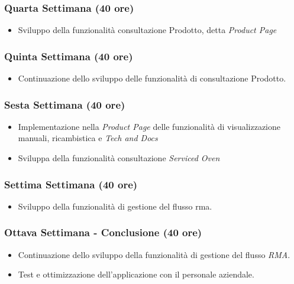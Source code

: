 \subsubsection*{Quarta Settimana (40 ore)}
\begin{itemize}
    \item Sviluppo della funzionalità consultazione Prodotto, detta \textit{Product Page}
\end{itemize}

\subsubsection*{Quinta Settimana (40 ore)}
\begin{itemize}
    \item Continuazione dello sviluppo delle funzionalità di consultazione Prodotto.
\end{itemize}

\subsubsection*{Sesta Settimana (40 ore)}
\begin{itemize}
    \item Implementazione nella \textit{Product Page} delle funzionalità di visualizzazione manuali, ricambistica e \textit{Tech and Docs} 
    \item Sviluppa della funzionalità consultazione \textit{Serviced Oven} 
\end{itemize}

\subsubsection*{Settima Settimana (40 ore)}
\begin{itemize}
    \item Sviluppo della funzionalità di gestione del flusso \gls{rma}\glox.
\end{itemize}

\subsubsection*{Ottava Settimana - Conclusione (40 ore)}
\begin{itemize}
    \item Continuazione dello sviluppo della funzionalità di gestione del flusso \textit{RMA}.
    \item Test e ottimizzazione dell'applicazione con il personale aziendale.
\end{itemize}


